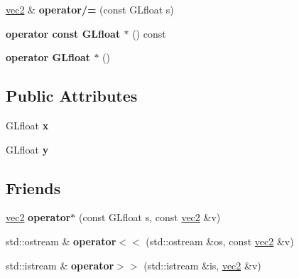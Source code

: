 \begin{DoxyCompactItemize}
\item 
\hypertarget{struct_angel_1_1vec2_a6ea8be1d732aea09b0f3f16f61fa2ef7}{\hyperlink{struct_angel_1_1vec2}{vec2} \& {\bfseries operator/=} (const \-G\-Lfloat s)}\label{struct_angel_1_1vec2_a6ea8be1d732aea09b0f3f16f61fa2ef7}

\item 
\hypertarget{struct_angel_1_1vec2_a5c3d2082bcc18734fde3689dbc605104}{{\bfseries operator const G\-Lfloat $\ast$} () const }\label{struct_angel_1_1vec2_a5c3d2082bcc18734fde3689dbc605104}

\item 
\hypertarget{struct_angel_1_1vec2_a8989f46bc38bb87bc2f6ea81f66c8545}{{\bfseries operator G\-Lfloat $\ast$} ()}\label{struct_angel_1_1vec2_a8989f46bc38bb87bc2f6ea81f66c8545}

\end{DoxyCompactItemize}
\subsection*{\-Public \-Attributes}
\begin{DoxyCompactItemize}
\item 
\hypertarget{struct_angel_1_1vec2_ab99b91871c08bbf76bf4a5e554ccac8f}{\-G\-Lfloat {\bfseries x}}\label{struct_angel_1_1vec2_ab99b91871c08bbf76bf4a5e554ccac8f}

\item 
\hypertarget{struct_angel_1_1vec2_a9f0e4c33e7884eca47d771ccfd4ea0bd}{\-G\-Lfloat {\bfseries y}}\label{struct_angel_1_1vec2_a9f0e4c33e7884eca47d771ccfd4ea0bd}

\end{DoxyCompactItemize}
\subsection*{\-Friends}
\begin{DoxyCompactItemize}
\item 
\hypertarget{struct_angel_1_1vec2_a1f371c4b26f86deb4d296dfff8ff1fc1}{\hyperlink{struct_angel_1_1vec2}{vec2} {\bfseries operator$\ast$} (const \-G\-Lfloat s, const \hyperlink{struct_angel_1_1vec2}{vec2} \&v)}\label{struct_angel_1_1vec2_a1f371c4b26f86deb4d296dfff8ff1fc1}

\item 
\hypertarget{struct_angel_1_1vec2_a5533e582fe94db90861caa394494f2cf}{std\-::ostream \& {\bfseries operator$<$$<$} (std\-::ostream \&os, const \hyperlink{struct_angel_1_1vec2}{vec2} \&v)}\label{struct_angel_1_1vec2_a5533e582fe94db90861caa394494f2cf}

\item 
\hypertarget{struct_angel_1_1vec2_af8cf130207f2cf5866ac13049e956c75}{std\-::istream \& {\bfseries operator$>$$>$} (std\-::istream \&is, \hyperlink{struct_angel_1_1vec2}{vec2} \&v)}\label{struct_angel_1_1vec2_af8cf130207f2cf5866ac13049e956c75}

\end{DoxyCompactItemize}


